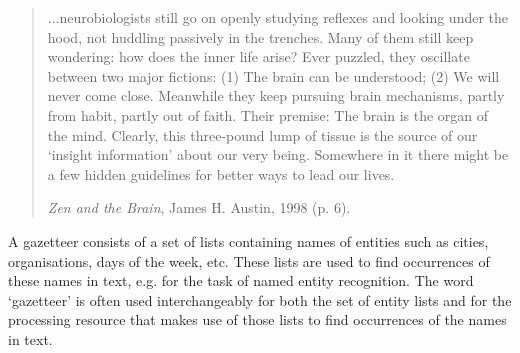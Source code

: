 %
%
%
%



\ifprintedbook 
\else
\begin{quote}
...neurobiologists still go on openly studying reflexes and looking
under the hood, not huddling passively in the trenches. Many of
them still keep wondering: how does the inner life arise? Ever puzzled,
they oscillate between two major fictions: (1) The brain can be
understood; (2) We will never come close. Meanwhile they keep pursuing
brain mechanisms, partly from habit, partly out of faith.
Their premise: The brain is the organ of the mind. Clearly, this
three-pound lump of tissue is the source of our `insight information'
about our very being. Somewhere in it there might be a few hidden
guidelines for better ways to lead our lives. 

{\it Zen and the Brain}, James H. Austin, 1998 (p. 6).
\end{quote}
\fi



A gazetteer consists of a set of lists containing names of entities such as
cities, organisations, days of the week, etc. These lists are used to
find occurrences of these names in text, e.g. for the 
task of named entity recognition.  
The word `gazetteer' is often used interchangeably for both the set of 
entity lists and for the processing resource that makes use of those
lists to find occurrences of the names in text.


